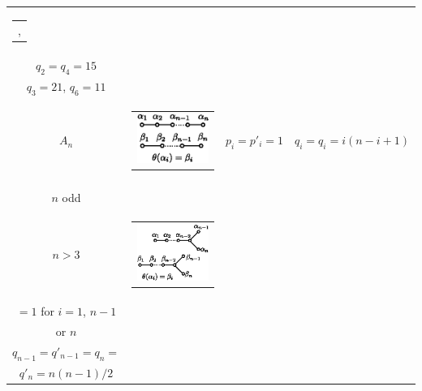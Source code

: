 {\begin{longtable}{@{}|c|c|l|l|@{}}
\begin{tabular}{l}
$ p_6 = 2$, $p_3 = 3$
\end{tabular} & 
\begin{tabular}{l}
$q_1 = q_5 = 16$,\\
 $q_2 = q_4 = 15$\\
$q_3 = 21$, $q_6 =11$
\end{tabular}\\\hline
$A_n$ &
\begin{tabular}{c}
{\includegraphics[scale=0.8]{318e.eps}}
\end{tabular} & 
$p_i = p'_i =1$ &
$q_i = q_i = i (n-i+1)$\\\hline
\begin{tabular}{c}
$D_n$ \\
$n$ odd\\
$n>3$
\end{tabular} & 
\begin{tabular}{c}
{\includegraphics[scale=0.8]{318f.eps}}
\end{tabular} & 
\begin{tabular}{l}
$p_i = p'_i = 2$ for $1< i < n -1$\\
\quad $ = 1 $ for $i = 1$, $n -1$\\
\qquad \quad or $n$
\end{tabular} & 
\begin{tabular}{l}
$q_i = q'_i = i (2n - i -1)$\\
$q_{n-1} = q'_{n-1} = q_n =$ \\
$q'_n = n (n-1) /2$
\end{tabular} \\\hline

\end{longtable}}
